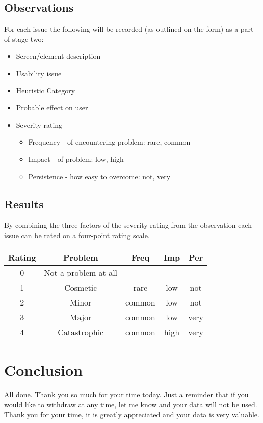 \documentclass[a4 paper, 10pt]{article}
\begin{document}
    \subsection*{Observations}
    For each issue the following will be recorded (as outlined on the form) as a part of stage two:
        \begin{itemize}
            \item Screen/element description
            \item Usability issue
            \item Heuristic Category
            \item Probable effect on user
            \item Severity rating
                \begin{itemize}
                    \item Frequency - of encountering problem: rare, common
                    \item Impact - of problem: low, high
                    \item Persistence - how easy to overcome: not, very
                \end{itemize}
        \end{itemize}   

    \subsection*{Results}
    By combining the three factors of the severity rating from the observation each issue can be rated on a four-point rating scale.
        \begin{center}
            \begin{tabular}{|c|c|c|c|c|}
                \hline
                Rating & Problem & Freq & Imp & Per \\
                \hline \hline
                0 & Not a problem at all & - & - & - \\
                \hline
                1 & Cosmetic & rare & low & not \\
                \hline
                2 & Minor & common & low & not \\
                \hline
                3 & Major & common & low & very \\
                \hline
                4 & Catastrophic & common & high & very \\
                \hline
            \end{tabular}
        \end{center}
 
\section*{Conclusion}
    \begin{itshape}
        All done. Thank you so much for your time today. Just a reminder that if you would like to withdraw at any time, let me know and your data will not be used. Thank you for your time, it is greatly appreciated and your data is very valuable.
    \end{itshape}
\end{document}
